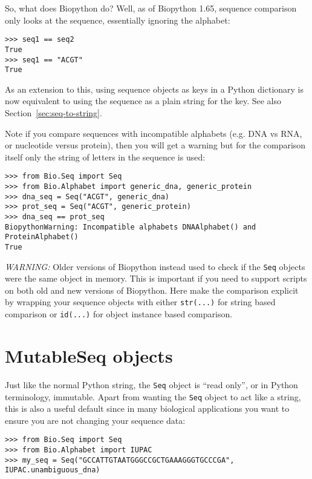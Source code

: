 So, what does Biopython do? Well, as of Biopython 1.65, sequence comparison
only looks at the sequence, essentially ignoring the alphabet:

\begin{verbatim}
>>> seq1 == seq2
True
>>> seq1 == "ACGT"
True
\end{verbatim}

As an extension to this, using sequence objects as keys in a Python dictionary
is now equivalent to using the sequence as a plain string for the key.
See also Section~\ref{sec:seq-to-string}.

Note if you compare sequences with incompatible alphabets (e.g. DNA vs RNA,
or nucleotide versus protein), then you will get a warning but for the
comparison itself only the string of letters in the sequence is used:
\begin{verbatim}
>>> from Bio.Seq import Seq
>>> from Bio.Alphabet import generic_dna, generic_protein
>>> dna_seq = Seq("ACGT", generic_dna)
>>> prot_seq = Seq("ACGT", generic_protein)
>>> dna_seq == prot_seq
BiopythonWarning: Incompatible alphabets DNAAlphabet() and ProteinAlphabet()
True
\end{verbatim}

\noindent
\emph{WARNING:} Older versions of Biopython instead used to check if the
\verb|Seq| objects were the same object in memory.
This is important if you need to support scripts on both old and new
versions of Biopython. Here make the comparison explicit by wrapping
your sequence objects with either \verb|str(...)| for string based
comparison or \verb|id(...)| for object instance based comparison.

\section{MutableSeq objects}
\label{sec:mutable-seq}

Just like the normal Python string, the \verb|Seq| object is ``read only'', or in Python terminology, immutable.  Apart from wanting the \verb|Seq| object to act like a string, this is also a useful default since in many biological applications you want to ensure you are not changing your sequence data:

\begin{verbatim}
>>> from Bio.Seq import Seq
>>> from Bio.Alphabet import IUPAC
>>> my_seq = Seq("GCCATTGTAATGGGCCGCTGAAAGGGTGCCCGA", IUPAC.unambiguous_dna)
\end{verbatim}

